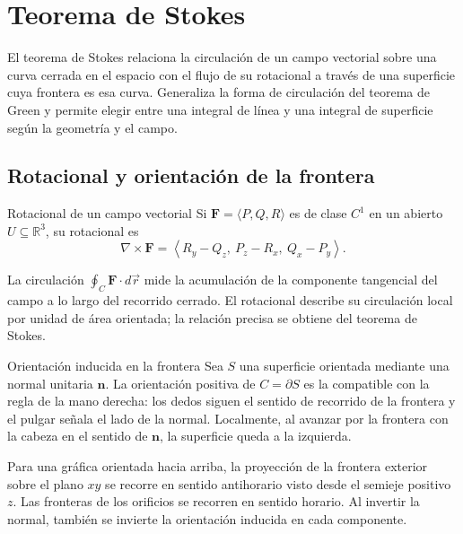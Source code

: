 \section{Teorema de Stokes}

El teorema de Stokes relaciona la circulación de un campo vectorial sobre una curva cerrada en el espacio con el flujo de su rotacional a través de una superficie cuya frontera es esa curva. Generaliza la forma de circulación del teorema de Green y permite elegir entre una integral de línea y una integral de superficie según la geometría y el campo.

\subsection{Rotacional y orientación de la frontera}

\begin{mydefinition}{Rotacional de un campo vectorial}
Si $\mathbf F=\langle P,Q,R\rangle$ es de clase $C^1$ en un abierto $U\subseteq\mathbb R^3$, su rotacional es
\[
\nabla\times\mathbf F
=\left\langle R_y-Q_z,\ P_z-R_x,\ Q_x-P_y\right\rangle.
\]
\end{mydefinition}
La circulación $\oint_C\mathbf F\cdot d\vec r$ mide la acumulación de la componente tangencial del campo a lo largo del recorrido cerrado. El rotacional describe su circulación local por unidad de área orientada; la relación precisa se obtiene del teorema de Stokes.

\begin{mydefinition}{Orientación inducida en la frontera}
Sea $S$ una superficie orientada mediante una normal unitaria $\mathbf n$. La orientación positiva de $C=\partial S$ es la compatible con la regla de la mano derecha: los dedos siguen el sentido de recorrido de la frontera y el pulgar señala el lado de la normal. Localmente, al avanzar por la frontera con la cabeza en el sentido de $\mathbf n$, la superficie queda a la izquierda.
\end{mydefinition}

\begin{center}
\begin{minipage}{.9\textwidth}
\centering
\begingroup\shorthandoff{>}
\def\manoNormal{\mathbf n}\def\manoRecorrido{C\text{ positivo}}

\endgroup
\end{minipage}
\end{center}

Para una gráfica orientada hacia arriba, la proyección de la frontera exterior sobre el plano $xy$ se recorre en sentido antihorario visto desde el semieje positivo $z$. Las fronteras de los orificios se recorren en sentido horario. Al invertir la normal, también se invierte la orientación inducida en cada componente.


